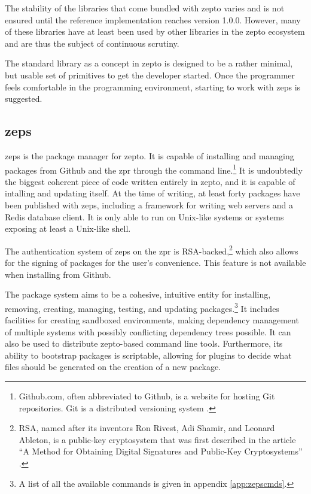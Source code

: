 \documentclass[oneside,11pt,xetex]{scrbook}
\begin{document}
The stability of the libraries that come bundled with zepto varies and is not
ensured until the reference implementation reaches version 1.0.0. However, many
of these libraries have at least been used by other libraries in the zepto
ecosystem and are thus the subject of continuous scrutiny.

The standard library as a concept in zepto is designed to be a rather minimal,
but usable set of primitives to get the developer started. Once the programmer
feels comfortable in the programming environment, starting to work with \gls{zeps}
is suggested.

\subsection{\gls{zeps}}

\gls{zeps} is the package manager for zepto. It is capable of installing and
managing packages from Github and the \gls{zpr} through the command line.\footnote{Github.com,
often abbreviated to Github, is a website for hosting Git repositories. Git is
a distributed versioning system \parencite{GIT}.} It
is undoubtedly the biggest coherent piece of code written entirely in zepto,
and it is capable of intalling and updating itself. At the time of writing,
at least forty packages have been published with \gls{zeps}, including a framework
for writing web servers and a Redis database client. It is only able to run
on Unix-like systems or systems exposing at least a Unix-like shell.

The authentication system of \gls{zeps} on the \gls{zpr} is RSA-backed,\footnote{RSA,
named after its inventors Ron Rivest, Adi Shamir, and Leonard Ableton, is a public-key
cryptosystem that was first described in the article ``A Method for Obtaining Digital
Signatures and Public-Key Cryptosystems'' \parencite{RSA}.} which
also allows for the signing of packages for the user's convenience. This feature
is not available when installing from Github.

The package system aims to be a cohesive, intuitive entity for installing,
removing, creating, managing, testing, and updating packages.\footnote{A list of
all the available commands is given in appendix \ref{app:zepscmds}.} It includes
facilities for creating sandboxed environments, making dependency management
of multiple systems with possibly conflicting dependency trees possible.
It can also be used to distribute zepto-based command line tools. Furthermore, its
ability to bootstrap packages is scriptable, allowing for plugins to
decide what files should be generated on the creation of a new package.
\end{document}
